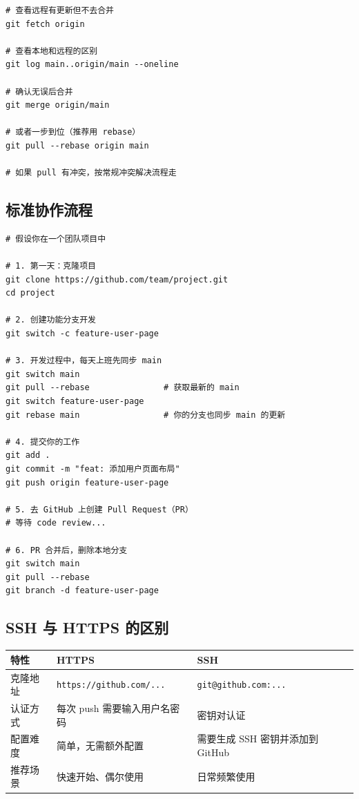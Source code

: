 \documentclass[12pt,a4paper]{article}
\begin{document}
\begin{lstlisting}
# 查看远程有更新但不去合并
git fetch origin

# 查看本地和远程的区别
git log main..origin/main --oneline

# 确认无误后合并
git merge origin/main

# 或者一步到位（推荐用 rebase）
git pull --rebase origin main

# 如果 pull 有冲突，按常规冲突解决流程走
\end{lstlisting}

\subsection{标准协作流程}

\begin{lstlisting}
# 假设你在一个团队项目中

# 1. 第一天：克隆项目
git clone https://github.com/team/project.git
cd project

# 2. 创建功能分支开发
git switch -c feature-user-page

# 3. 开发过程中，每天上班先同步 main
git switch main
git pull --rebase               # 获取最新的 main
git switch feature-user-page
git rebase main                 # 你的分支也同步 main 的更新

# 4. 提交你的工作
git add .
git commit -m "feat: 添加用户页面布局"
git push origin feature-user-page

# 5. 去 GitHub 上创建 Pull Request（PR）
# 等待 code review...

# 6. PR 合并后，删除本地分支
git switch main
git pull --rebase
git branch -d feature-user-page
\end{lstlisting}

\subsection{SSH 与 HTTPS 的区别}

\begin{longtable}{|p{3.5cm}|p{5cm}|p{5cm}|}
\hline
\textbf{特性} & \textbf{HTTPS} & \textbf{SSH} \\
\hline
克隆地址 & \texttt{https://github.com/...} & \texttt{git@github.com:...} \\
\hline
认证方式 & 每次 push 需要输入用户名密码 & 密钥对认证 \\
\hline
配置难度 & 简单，无需额外配置 & 需要生成 SSH 密钥并添加到 GitHub \\
\hline
推荐场景 & 快速开始、偶尔使用 & 日常频繁使用 \\
\hline
\end{longtable}
\end{document}
